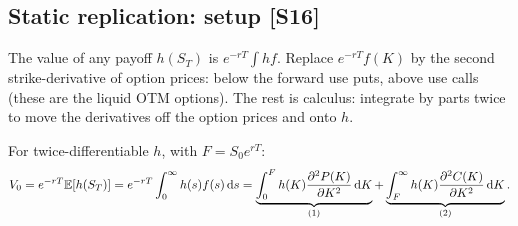 \documentclass[10pt]{article}
\begin{document}
\subsection{Static replication: setup [S16]}
\begin{idea}
The value of any payoff $h(S_T)$ is $e^{-rT}\int hf$. Replace $e^{-rT}f(K)$ by the second strike-derivative of option prices: below the forward use puts, above use calls (these are the liquid OTM options). The rest is calculus: integrate by parts twice to move the derivatives off the option prices and onto $h$.
\end{idea}
For twice-differentiable $h$, with $F=S_0e^{rT}$:
\[V_0=e^{-rT}\mathbb{E}[h(S_T)]=e^{-rT}\int_0^\infty h(s)f(s)\,\mathrm{d} s=\underbrace{\int_0^Fh(K)\frac{\partial^2P(K)}{\partial K^2}\,\mathrm{d} K}_{(1)}+\underbrace{\int_F^\infty h(K)\frac{\partial^2C(K)}{\partial K^2}\,\mathrm{d} K}_{(2)}.\]
\begin{where}
\end{where}
\end{document}
